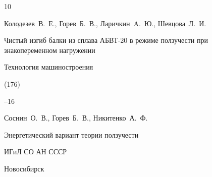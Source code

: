 \begin{thebibliography}{10}





\by  Колодезев~В.~Е., Горев~Б.~В., Ларичкин~A.~Ю., Шевцова~Л.~И.

\paper Чистый изгиб балки из сплава АБВТ-20 в режиме ползучести при знакопеременном нагружении

\jour Технология машиностроения


(176)

--16













\by Соснин~О.~В., Горев~Б.~В., Никитенко~А.~Ф.  

\book Энергетический вариант теории ползучести


\publ ИГиЛ СО АН СССР

\publaddr Новосибирск





























\end{thebibliography}
